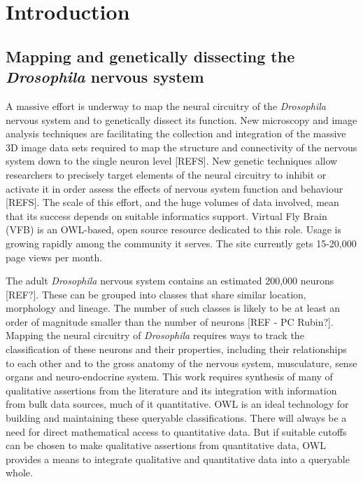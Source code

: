 \documentclass[runningheads,a4paper]{llncs}
\begin{document}
\section{Introduction}


\subsection{Mapping and genetically dissecting the \textit{Drosophila}
  nervous system}


A massive effort is underway to map the neural circuitry of the
\textit{Drosophila} nervous system and to genetically dissect its
function. New microscopy and image analysis techniques are
facilitating the collection and integration of the massive 3D image
data sets required to map the structure and connectivity of the
nervous system down to the single neuron level [REFS]. New genetic %
techniques allow researchers to precisely target elements of the
neural circuitry to inhibit or activate it in order assess the effects
of nervous system function and behaviour [REFS]. The scale of this %
effort, and the huge volumes of data involved, mean that its success
depends on suitable informatics support. Virtual Fly Brain (VFB)
\cite{pmid22180411,pmid22402613} is an OWL-based, open source
resource dedicated to this role. Usage is growing rapidly among the community
it serves.  The site currently gets 15-20,000 page views per month.

The adult \textit{Drosophila} nervous system contains an estimated
200,000 neurons [REF?].  These can be grouped into classes that share
similar location, morphology and lineage.  The number of such classes
is likely to be at least an order of magnitude smaller than the number
of neurons [REF - PC Rubin?].  Mapping the neural circuitry of \textit{Drosophila}
requires ways to track the classification of these neurons and their
properties, including their relationships to each other and to the
gross anatomy of the nervous system, musculature, sense organs and
neuro-endocrine system.  This work requires synthesis of many of
qualitative assertions from the literature and its integration with
information from bulk data sources, much of it quantitative.  OWL
is an ideal technology for building and maintaining these queryable
classifications. There will always be a need for direct mathematical
access to quantitative data.  But if suitable cutoffs can be
chosen to make qualitative assertions from quantitative data, OWL
provides a means to integrate qualitative and quantitative data into a
queryable whole.
\end{document}
